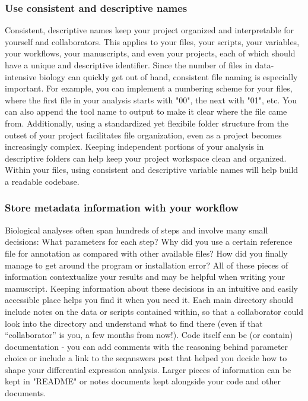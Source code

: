 \documentclass[10pt,letterpaper]{article}
\begin{document}
\subsubsection*{Use consistent and descriptive names}  
Consistent, descriptive names keep your project organized and interpretable for yourself and collaborators. 
This applies to your files, your scripts, your variables, your workflows, your manuscripts, and even your projects, each of which should have a unique and descriptive identifier. 
Since the number of files in data-intensive biology can quickly get out of hand, consistent file naming is especially important. 
For example, you can implement a numbering scheme for your files, where the first file in your analysis starts with "00", the next with "01", etc. 
You can also append the tool name to output to make it clear where the file came from. 
Additionally, using a standardized yet flexibile folder structure from the outset of your project facilitates file organization, even as a project becomes increasingly complex. 
Keeping independent portions of your analysis in descriptive folders can help keep your project workspace clean and organized.
Within your files, using consistent and descriptive variable names will help build a readable codebase.

\subsubsection*{Store metadata information with your workflow} 
Biological analyses often span hundreds of steps and involve many small decisions: What parameters for each step? 
Why did you use a certain reference file for annotation as compared with other available files? 
How did you finally manage to get around the program or installation error? 
All of these pieces of information contextualize your results and may be helpful when writing your manuscript. 
Keeping information about these decisions in an intuitive and easily accessible place helps you find it when you need it. 
Each main directory should include notes on the data or scripts contained within, so that a collaborator could look into the directory and understand what to find there (even if that “collaborator” is you, a few months from now!). 
Code itself can be (or contain) documentation - you can add comments with the reasoning behind parameter choice or include a link to the seqanswers post that helped you decide how to shape your differential expression analysis. 
Larger pieces of information can be kept in "README" or notes documents kept alongside your code and other documents. 
\end{document}
